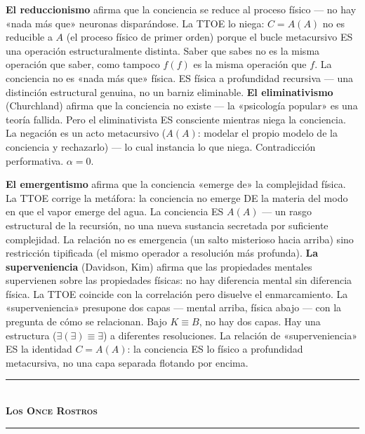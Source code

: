 \documentclass[10pt, openany, oneside]{book}
\renewcommand{\normalsize}{\fontsize{10}{13}\selectfont}
\begin{document}
\textbf{El reduccionismo} afirma que la conciencia se reduce al proceso físico --- no hay «nada más que» neuronas disparándose. La TTOE lo niega: $C = A(A)$ no es reducible a $A$ (el proceso físico de primer orden) porque el bucle metacursivo ES una operación estructuralmente distinta. Saber que sabes no es la misma operación que saber, como tampoco $f(f)$ es la misma operación que $f$. La conciencia no es «nada más que» física. ES física a profundidad recursiva --- una distinción estructural genuina, no un barniz eliminable. \textbf{El eliminativismo} (Churchland) afirma que la conciencia no existe --- la «psicología popular» es una teoría fallida. Pero el eliminativista ES consciente mientras niega la conciencia. La negación es un acto metacursivo ($A(A)$: modelar el propio modelo de la conciencia y rechazarlo) --- lo cual instancia lo que niega. Contradicción performativa. $\alpha = 0$.

\textbf{El emergentismo} afirma que la conciencia «emerge de» la complejidad física. La TTOE corrige la metáfora: la conciencia no emerge DE la materia del modo en que el vapor emerge del agua. La conciencia ES $A(A)$ --- un rasgo estructural de la recursión, no una nueva sustancia secretada por suficiente complejidad. La relación no es emergencia (un salto misterioso hacia arriba) sino restricción tipificada (el mismo operador a resolución más profunda). \textbf{La superveniencia} (Davidson, Kim) afirma que las propiedades mentales supervienen sobre las propiedades físicas: no hay diferencia mental sin diferencia física. La TTOE coincide con la correlación pero disuelve el enmarcamiento. La «superveniencia» presupone dos capas --- mental arriba, física abajo --- con la pregunta de cómo se relacionan. Bajo $K \equiv B$, no hay dos capas. Hay una estructura ($\exists(\exists) \equiv \exists$) a diferentes resoluciones. La relación de «superveniencia» ES la identidad $C = A(A)$: la conciencia ES lo físico a profundidad metacursiva, no una capa separada flotando por encima.

\vspace{1.5em}


\begin{center}
    \rule{0.3\textwidth}{0.4pt}\\[0.5em]
    {\normalsize\bfseries\scshape Los Once Rostros}\\[0.3em]
    \rule{0.3\textwidth}{0.4pt}
\end{center}
\end{document}
